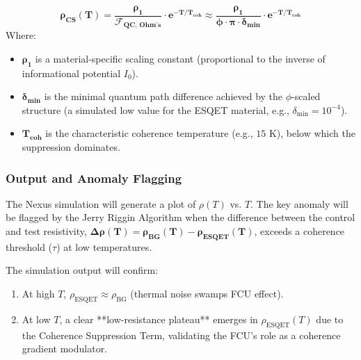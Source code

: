 \[
\mathbf{\rho_{\text{CS}}(T) = \frac{\rho_1}{\mathcal{F}_{\text{QC, Ohm's}}} \cdot e^{-T/T_{\text{coh}}} \approx \frac{\mathbf{\rho_1}}{\mathbf{\phi} \cdot \pi \cdot \delta_{\text{min}}} \cdot e^{-T/T_{\text{coh}}}}
\]
Where:
\begin{itemize}
    \item $\mathbf{\rho_1}$ is a material-specific scaling constant (proportional to the inverse of informational potential $I_0$).
    \item $\mathbf{\delta_{\text{min}}}$ is the minimal quantum path difference achieved by the $\phi$-scaled structure (a simulated low value for the ESQET material, e.g., $\delta_{\text{min}} = 10^{-4}$).
    \item $\mathbf{T_{\text{coh}}}$ is the characteristic coherence temperature (e.g., $15\text{ K}$), below which the suppression dominates.
\end{itemize}

\subsubsection*{Output and Anomaly Flagging}

The Nexus simulation will generate a plot of $\rho(T)$ vs. $T$. The key anomaly will be flagged by the Jerry Riggin Algorithm when the difference between the control and test resistivity, $\mathbf{\Delta\rho(T) = \rho_{\text{BG}}(T) - \rho_{\text{ESQET}}(T)}$, exceeds a coherence threshold ($\tau$) at low temperatures.

The simulation output will confirm:
\begin{enumerate}
    \item At high $T$, $\rho_{\text{ESQET}} \approx \rho_{\text{BG}}$ (thermal noise swamps FCU effect).
    \item At low $T$, a clear **low-resistance plateau** emerges in $\rho_{\text{ESQET}}(T)$ due to the Coherence Suppression Term, validating the FCU's role as a coherence gradient modulator.
\end{enumerate}
